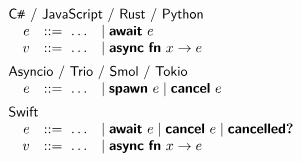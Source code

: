 $$
\begin{array}{@{\quad} r c l}
  \multicolumn{3}{@{}l}{\textsf{\CSharp\ / \Js\ / Rust / Python}} \\
  e & ::=\ \ldots & \mid \mathbfsf{await}\ e \\
  v & ::=\ \ldots & \mid \mathbfsf{async}\ \mathbfsf{fn}\ \many{x} \to e \\[0.5em]
  \multicolumn{3}{@{}l}{\textsf{Asyncio / Trio / Smol / Tokio}} \\
  e & ::=\ \ldots & \mid \mathbfsf{spawn}\ e \mid \mathbfsf{cancel}\ e \\[0.5em]
  \multicolumn{3}{@{}l}{\textsf{Swift}} \\
  e & ::=\ \ldots & \mid \mathbfsf{await}\ e \mid \mathbfsf{cancel}\ e \mid \mathbfsf{cancelled?} \\
  v & ::=\ \ldots & \mid \mathbfsf{async}\ \mathbfsf{fn}\ \many{x} \to e
\end{array}
$$
